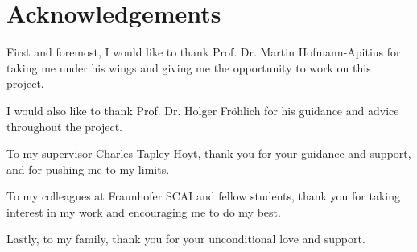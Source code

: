 \chapter*{Acknowledgements}

First and foremost, I would like to thank Prof. Dr. Martin Hofmann-Apitius for taking me under his wings and giving me the opportunity to work on this project.

I would also like to thank Prof. Dr. Holger Fröhlich for his guidance and advice throughout the project.

To my supervisor Charles Tapley Hoyt, thank you for your guidance and support, and for pushing me to my limits.

To my colleagues at Fraunhofer SCAI and fellow students, thank you for taking interest in my work and encouraging me to do my best.

Lastly, to my family, thank you for your unconditional love and support.